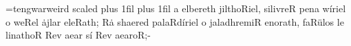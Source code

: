 \font\elvish=tengwarweird scaled 
\elvish\baselineskip=18pt
\obeylines
\leftskip 1in plus 1fil
\rightskip 1in plus 1fil
\nopagenumbers
a elbereth jilthoRiel,
silivreR pena w\'iriel
o weRel \.ajlar eleRath;
R\.a shaered palaRd\'iriel
o jaladhremiR enorath,
faR\"ulos le linathoR
Rev aear s\'i Rev aearoR;-
\bye
